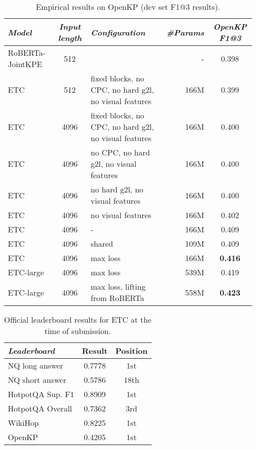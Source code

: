 \documentclass[11pt,a4paper]{article}
\begin{document}
\begin{table*}[tb]\centering 
\begin{small}
\begin{tabular}{lclr|c} 
{\em Model} & {\em Input length} & {\em Configuration} & {\em \#Params} & {\em OpenKP F1@3} \\ \hline
RoBERTa-JointKPE    & 512   &  & - & 0.398 \\ \hline
ETC	    &   512     & fixed blocks, no CPC, no hard g2l, no visual features      & 166M & 0.399 \\
ETC	    &   4096	& fixed blocks, no CPC, no hard g2l, no visual features      & 166M & 0.400 \\
ETC	    &   4096	& no CPC, no hard g2l, no visual features                         & 166M & 0.400 \\
ETC	    &   4096	& no hard g2l, no visual features  & 166M & 0.400 \\
ETC	    &   4096	& no visual features  & 166M & 0.402  \\
ETC	    &   4096    & -                         & 166M & 0.409 \\ 
ETC	    &   4096    & shared                         & 109M & 0.409 \\
ETC	    &   4096    & max loss                         & 166M &  {\bf 0.416} \\ \hline
ETC-large	&   4096    & max loss                    & 539M &  0.419 \\
ETC-large	&   4096    & max loss, lifting from RoBERTa                    & 558M & {\bf 0.423} \\
\end{tabular}		
\end{small}
\caption{Empirical results on OpenKP (dev set F1@3 results).}
\label{tbl:results-openkp} 
\end{table*}



\begin{table}[tb]\centering 
\begin{small}
\begin{tabular}{l|cc}
{\em Leaderboard} & Result & Position \\ \hline
NQ long answer  &  0.7778   & 1st \\
NQ short answer  &  0.5786   & 18th \\
HotpotQA Sup. F1  &   0.8909   & 1st \\
HotpotQA Overall  &   0.7362   & 3rd \\
WikiHop  &   0.8225   & 1st \\
OpenKP  &   0.4205   & 1st \\
\end{tabular}
\end{small}
\caption{Official leaderboard results for ETC at the time of submission.}
\label{tbl:results-leaderboard} 
\end{table}
\end{document}
